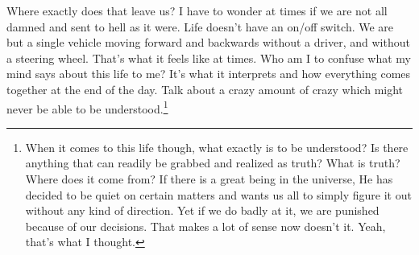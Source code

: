 Where exactly does that leave us? I have to wonder at times if we are not all
damned and sent to hell as it were. Life doesn't have an on/off switch. We are
but a single vehicle moving forward and backwards without a driver, and without
a steering wheel. That's what it feels like at times. Who am I to confuse what
my mind says about this life to me? It's what it interprets and how everything
comes together at the end of the day. Talk about a crazy amount of crazy which
might never be able to be understood.\footnote{
When it comes to this life though, what exactly is to be understood? Is there
anything that can readily be grabbed and realized as truth? What is truth? Where
does it come from? If there is a great being in the universe, He has decided to
be quiet on certain matters and wants us all to simply figure it out without any
kind of direction. Yet if we do badly at it, we are punished because of our
decisions. That makes a lot of sense now doesn't it. Yeah, that's what I
thought.
}

